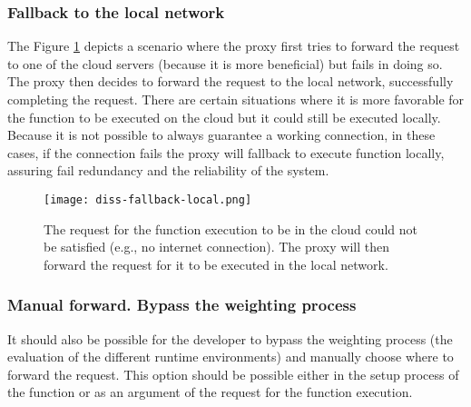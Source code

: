 \subsubsection{Fallback to the local network}
\label{usecases:fallback}

The Figure \ref{fig:fallback-local} depicts a scenario where the proxy first tries
to forward the request to one of the cloud servers (because it is more beneficial)
but fails in doing so. The proxy then decides to forward the request to the local
network, successfully completing the request. There are certain situations where
it is more favorable for the function to be executed on the cloud but it could
still be executed locally. Because it is not possible to always guarantee a
working connection, in these cases, if the connection fails the proxy will
fallback to execute function locally, assuring fail redundancy and the reliability
of the system.

\begin{figure}[ht]
  \begin{center}
    \texttt{[image: diss-fallback-local.png]}
    \caption{The request for the function execution to be in the cloud could not be satisfied (e.g., no internet connection). The proxy will then forward the
request for it to be executed in the local network.}
    \label{fig:fallback-local}
  \end{center}
\end{figure}

\subsubsection{Manual forward. Bypass the weighting process}
\label{usecases:manual_forward}

It should also be possible for the developer to bypass the weighting process (the
evaluation of the different runtime environments) and manually choose where to forward the
request. This option should be possible either in the setup process of the
function or as an argument of the request for the function execution. 

